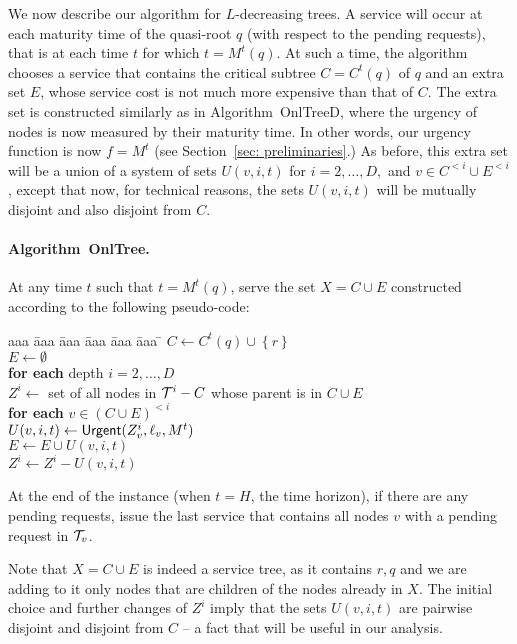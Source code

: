 \documentclass[a4paper]{article}
\newcommand{\calT}{{\cal T}}
\newcommand{\braced}[1]{{ \left\{ #1 \right\} }}
\newcommand{\length}{\ell}
\newcommand{\OnAlgTreesDeadlines}{{\sc OnlTreeD}}
\newcommand{\OnAlgTreesGeneral}{{\sc OnlTree}}
\newcommand{\urgentnodes}{\mbox{\rm\textsf{Urgent}}}
\newcommand{\vertmaturity}{M}
\begin{document}
We now describe our algorithm for $L$-decreasing trees.
A service will occur at each maturity
time of the quasi-root $q$ (with respect to the pending requests), 
that is at each time $t$ for which $t=\vertmaturity^t(q)$.
At such a time, the algorithm chooses a service that contains the critical subtree
$C = C^t(q)$ of $q$ and an extra set $E$, whose service cost is not much more
expensive than that of $C$. The extra set is constructed similarly as
in Algorithm~{\OnAlgTreesDeadlines}, where the urgency of nodes is now measured
by their maturity time. In other words, our urgency function
is now $f = \vertmaturity^t$ (see Section~\ref{sec: preliminaries}.)
As before, this extra set will be a union of a
system of sets $U(v,i,t)$ for $i=2,\ldots,D,$ and $v\in C^{<i}\cup
E^{<i}$, except that now, for technical reasons,
the sets $U(v,i,t)$ will be mutually disjoint and also disjoint from $C$.

\paragraph{Algorithm~{\OnAlgTreesGeneral}.}

At any time $t$ such that $t=\vertmaturity^t(q)$, serve the set 
$X = C\cup E$ constructed according to the following pseudo-code:
\begin{tabbing}
aaa \= aaa \= aaa \= aaa \= aaa \= aaa \= \kill
\>
$C\gets C^t(q) \cup \braced{r}$
\\
\> $E\gets \emptyset$
\\
\> \textbf{for each} depth $i=2,\ldots,D$
\\
\> \> $Z^i\gets$ set of all nodes in $\calT^i - C$ whose parent is in $C\cup
E$
\\
\> \> \textbf{for each} $v\in (C\cup E)^{<i}$ 
\\
\> \> \> $U(v,i,t) \gets \urgentnodes(Z^i_v,\length_v,\vertmaturity^t)$ 
\\
\> \> \> $E \gets E \cup U(v,i,t)$
\\
\> \> \> $Z^i \gets Z^i - U(v,i,t)$
\end{tabbing}
At the end of the instance (when $t=H$, the time horizon), if there
are any pending requests, issue the last service that contains
all nodes $v$ with a pending request in $\calT_v$.



\medskip

Note that $X=C\cup E$ is indeed a service tree, as it contains $r,q$ and we are
adding to it only nodes  that are children of the nodes already in $X$.
The initial choice and further changes of $Z^i$ imply that the sets
$U(v,i,t)$ are pairwise disjoint and disjoint from $C$ -- a fact that will
be useful in our analysis. 
\end{document}
